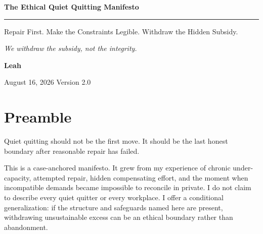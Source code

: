 \documentclass[11pt,oneside]{article}
\begin{document}
\hypersetup{pageanchor=false}

\begin{titlepage}
\thispagestyle{empty}
\vspace*{0.9in}

{\sffamily\bfseries\fontsize{31}{36}\selectfont\color{ManifestInk}
The Ethical Quiet Quitting Manifesto\par}

\vspace{0.5em}
{\color{ManifestRule}\rule{\textwidth}{1.2pt}}
\vspace{1.0em}

{\sffamily\fontsize{17}{23}\selectfont\color{ManifestGray}
Repair First. Make the Constraints Legible. Withdraw the Hidden
Subsidy.\par}

\vfill

\begin{tcolorbox}[
  enhanced,
  colback=ManifestLight,
  colframe=ManifestRule,
  boxrule=0pt,
  leftrule=4pt,
  arc=0pt,
  left=14pt,right=14pt,top=13pt,bottom=13pt
]
{\Large\itshape We withdraw the subsidy, not the integrity.}
\end{tcolorbox}
\vfill

{\sffamily\large\bfseries Leah\par}
\vspace{0.2em}
{\sffamily\color{ManifestGray}August 16, 2026 \quad Version 2.0\par}
\vspace{0.55in}
\end{titlepage}

\thispagestyle{plain}
\tableofcontents
\clearpage
{}
\hypersetup{pageanchor=true}

\hypertarget{preamble}{%
\section{Preamble}\label{preamble}}

Quiet quitting should not be the first move. It should be the last
honest boundary after reasonable repair has failed.

This is a case-anchored manifesto. It grew from my experience of chronic
under-capacity, attempted repair, hidden compensating effort, and the
moment when incompatible demands became impossible to reconcile in
private. I do not claim to describe every quiet quitter or every
workplace. I offer a conditional generalization: if the structure and
safeguards named here are present, withdrawing unsustainable excess can
be an ethical boundary rather than abandonment.
\end{document}
